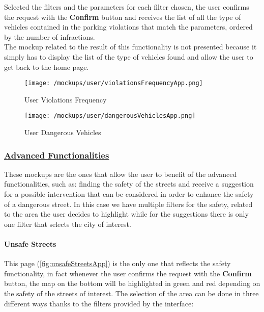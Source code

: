 			Selected the filters and the parameters for each filter chosen, the user confirms the request with the \textbf{Confirm} button and receives the list of all the type of vehicles contained in the parking violations that match the parameters, ordered by the number of infractions.\\
			
			The mockup related to the result of this functionality is not presented because it simply has to display the list of the type of vehicles found and allow the user to get back to the home page.
			
			\vspace{0.6cm}
			
			\begin{figure}[ht!]
				\centering
				\begin{minipage}{0.5\textwidth}
					\centering
					\texttt{[image: /mockups/user/violationsFrequencyApp.png]}
					\caption{\label{fig:violationsFrequencyApp} User Violations Frequency}
				\end{minipage}\hfill
				\begin{minipage}{0.5\textwidth}
					\centering
					\texttt{[image: /mockups/user/dangerousVehiclesApp.png]}
					\caption{\label{fig:dangerousVechiclesApp} User Dangerous Vehicles}
				\end{minipage}
			\end{figure}
		
		\subsubsection[Advanced Functionalities]{\hyperlink{toc}{Advanced Functionalities}}
			\label{sec:userAdvancedFunctionalities}
			
			These mockups are the ones that allow the user to benefit of the advanced functionalities, such as: finding the safety of the streets and receive a suggestion for a possible intervention that can be considered in order to enhance the safety of a dangerous street. In this case we have multiple filters for the safety, related to the area the user decides to highlight while for the suggestions there is only one filter that selects the city of interest.
			
			\paragraph{Unsafe Streets}
			This page (\autoref{fig:unsafeStreetsApp}) is the only one that reflects the safety functionality, in fact whenever the user confirms the request with the \textbf{Confirm}
			button, the map on the bottom will be highlighted in green and red depending on the safety of the streets of interest. The selection of the area can be done in three different ways thanks to the filters provided by the interface:
			
